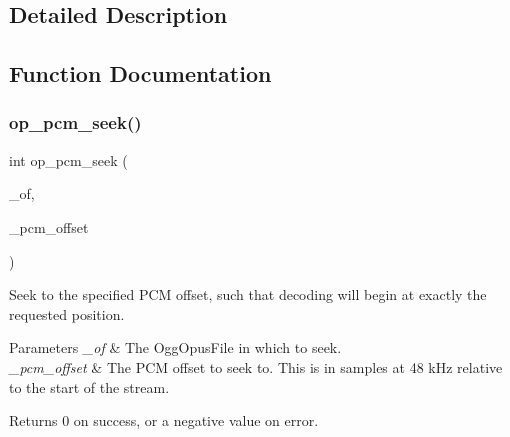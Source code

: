 \subsection{Detailed Description}


\subsection{Function Documentation}
\mbox{\label{group__stream__seeking_gad4f20d0601c2bab8d724f647673ae92c}} 
\subsubsection{\texorpdfstring{op\+\_\+pcm\+\_\+seek()}{op\_pcm\_seek()}}
{\footnotesize\ttfamily int op\+\_\+pcm\+\_\+seek (\begin{DoxyParamCaption}\item[{Ogg\+Opus\+File $\ast$}]{\+\_\+of,  }\item[{ogg\+\_\+int64\+\_\+t}]{\+\_\+pcm\+\_\+offset }\end{DoxyParamCaption})}

Seek to the specified P\+CM offset, such that decoding will begin at exactly the requested position. 
\begin{DoxyParams}{Parameters}
{\em \+\_\+of} & The {\ttfamily Ogg\+Opus\+File} in which to seek. \\
\hline
{\em \+\_\+pcm\+\_\+offset} & The P\+CM offset to seek to. This is in samples at 48 k\+Hz relative to the start of the stream. \\
\hline
\end{DoxyParams}
\begin{DoxyReturn}{Returns}
0 on success, or a negative value on error. 
\end{DoxyReturn}

